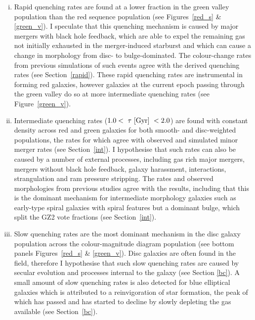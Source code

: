 \begin{enumerate}[(i)]
\item Rapid quenching rates are found at a lower fraction in the green valley population than the red sequence population (see Figures~\ref{red_s} \& \ref{green_v}). I speculate that this quenching mechanism is caused by major mergers with black hole feedback, which are able to expel the remaining gas not initially exhausted in the merger-induced starburst and which can cause a change in morphology from disc- to bulge-dominated. The colour-change rates from previous simulations of such events agree with the derived quenching rates (see Section~\ref{rapid}). These rapid quenching rates are instrumental in forming red galaxies, however galaxies at the current epoch passing through the green valley do so at more intermediate quenching rates (see Figure~\ref{green_v}).

\item Intermediate quenching rates ($1.0 < ~\tau~\rm{[Gyr]}~ < 2.0 $) are found with constant density across red and green galaxies for both smooth- and disc-weighted populations, the rates for which agree with observed and simulated minor merger rates (see Section~\ref{int}). I hypothesise that such rates can also be caused by a number of external processes, including gas rich major mergers, mergers without black hole feedback, galaxy harassment, interactions, strangulation and ram pressure stripping. The rates and observed morphologies from previous studies agree with the results, including that this is the dominant mechanism for intermediate morphology galaxies such as early-type spiral galaxies with spiral features but a dominant bulge, which split the GZ2 vote fractions (see Section~\ref{int}). 

\item Slow quenching rates are the most dominant mechanism in the disc galaxy population across the colour-magnitude diagram population (see bottom panels Figures~\ref{red_s} \& \ref{green_v}). Disc galaxies are often found in the field, therefore I hypothesise that such slow quenching rates are caused by secular evolution and processes internal to the galaxy (see Section \ref{bc}). A small amount of slow quenching rates is also detected for blue elliptical galaxies which is attributed to a reinvigoration of star formation, the peak of which has passed and has started to decline by slowly depleting the gas available (see Section~\ref{bc}). 
\end{enumerate}
